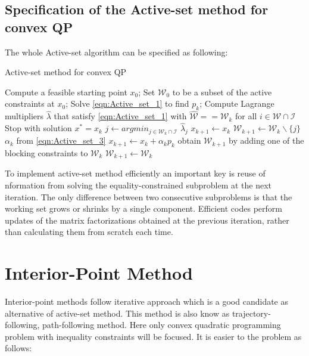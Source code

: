 \subsection*{Specification of the Active-set method for convex QP}
The whole Active-set algorithm can be specified as following:

\begin{algorithm}[h]
  \caption{Active-set method for convex QP}\label{euclid}
  \begin{algorithmic}[1]
      \State Compute a feasible starting point $x_0$;
      \State Set $\mathcal{W}_0$ to be a subset of the active constraints at $x_0$;
        \State Solve \ref{eqn:Active_set_1} to find $p_k$;
          \State Compute Lagrange multipliers $\hat{\lambda}$ that satisfy \ref{eqn:Active_set_1} with $\hat{\mathcal{W}}==\mathcal{W}_k$
           for all $i \in \mathcal{W}\cap \mathcal{I}$
          	\State Stop with solution $x^* = x_k$
          \Else
          	\State $j \gets argmin_{j\in \mathcal{W}_k \cap \mathcal{I}}$ $\hat{\lambda}_j$
          	\State $x_{k+1} \gets x_k$
          	\State $\mathcal{W}_{k+1} \gets \mathcal{W}_k\backslash \lbrace{j \rbrace}$
          \EndIf 
        \Else
          \State $\alpha_k$ from \ref{eqn:Active_set_3}
          \State $x_{k+1} \gets x_k + \alpha_kp_k$
          	\State obtain $\mathcal{W}_{k+1}$ by adding one of the blocking constraints to $\mathcal{W}_k$
          \Else
          	\State $\mathcal{W}_{k+1} \gets \mathcal{W}_k$  
          \EndIf
        \EndIf
      \EndFor
    \EndProcedure
  \end{algorithmic}
\end{algorithm}
To implement active-set method efficiently an important key is reuse of nformation from solving the equality-constrained subproblem at the next iteration. The only difference between two consecutive subproblems is that the working set grows or shrinks by a single component. Efficient codes perform updates of the matrix factorizations obtained at the previous iteration, rather than calculating them from scratch each time.



\section{Interior-Point Method}
Interior-point methods follow iterative approach which is a good candidate as alternative of active-set method. This method is also know as trajectory-following, path-following method. 
Here only convex quadratic programming problem with inequality constraints will be focused. It is easier to the problem as follows:

